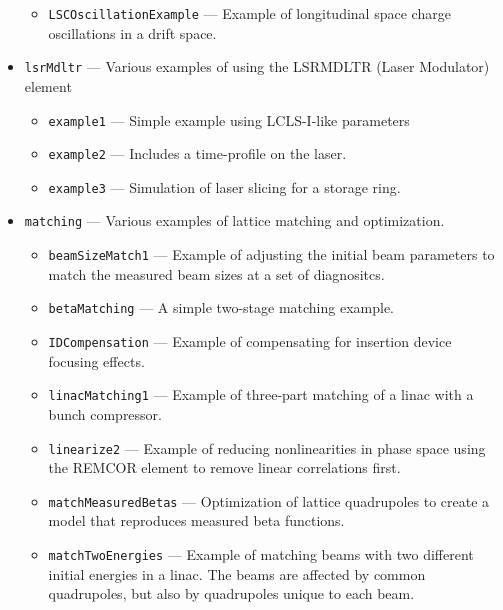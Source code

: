 \begin{itemize}
\begin{itemize}
\item \verb|LSCOscillationExample| --- 
Example of longitudinal space charge oscillations in a drift space.

\end{itemize}
\item \verb|lsrMdltr| --- 
 Various examples of using the LSRMDLTR (Laser Modulator) element 

\begin{itemize}
\item \verb|example1| --- 
 Simple example using LCLS-I-like parameters 

\item \verb|example2| --- 
 Includes a time-profile on the laser. 

\item \verb|example3| --- 
 Simulation of laser slicing for a storage ring. 

\end{itemize}
\item \verb|matching| --- 
Various examples of lattice matching and optimization.

\begin{itemize}
\item \verb|beamSizeMatch1| --- 
 Example of adjusting the initial beam parameters to match the measured beam sizes at a set of diagnositcs. 

\item \verb|betaMatching| --- 
 A simple two-stage matching example. 

\item \verb|IDCompensation| --- 
Example of compensating for insertion device focusing effects.

\item \verb|linacMatching1| --- 
 Example of three-part matching of a linac with a bunch compressor. 

\item \verb|linearize2| --- 
 Example of reducing nonlinearities in phase space using the REMCOR element to remove linear correlations first.

\item \verb|matchMeasuredBetas| --- 
 Optimization of lattice quadrupoles to create a model that reproduces measured beta functions. 

\item \verb|matchTwoEnergies| --- 
 Example of matching beams with two different initial energies in a linac. The beams are affected by common quadrupoles, but also by quadrupoles unique to each beam. 


\end{itemize}
\end{itemize}
